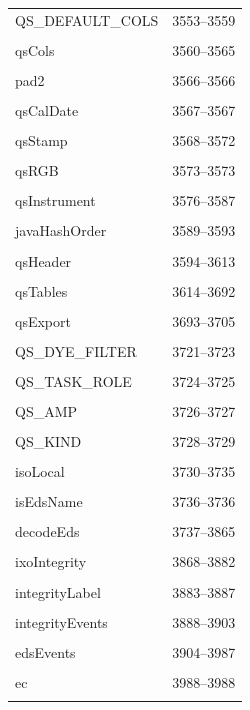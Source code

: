 {\begin{longtable}{@{}p{11cm}r@{}}
QS\_DEFAULT\_COLS & 3553--3559 \\\\\hline
qsCols & 3560--3565 \\\\\hline
pad2 & 3566--3566 \\\\\hline
qsCalDate & 3567--3567 \\\\\hline
qsStamp & 3568--3572 \\\\\hline
qsRGB & 3573--3573 \\\\\hline
qsInstrument & 3576--3587 \\\\\hline
javaHashOrder & 3589--3593 \\\\\hline
qsHeader & 3594--3613 \\\\\hline
qsTables & 3614--3692 \\\\\hline
qsExport & 3693--3705 \\\\\hline
QS\_DYE\_FILTER & 3721--3723 \\\\\hline
QS\_TASK\_ROLE & 3724--3725 \\\\\hline
QS\_AMP & 3726--3727 \\\\\hline
QS\_KIND & 3728--3729 \\\\\hline
isoLocal & 3730--3735 \\\\\hline
isEdsName & 3736--3736 \\\\\hline
decodeEds & 3737--3865 \\\\\hline
ixoIntegrity & 3868--3882 \\\\\hline
integrityLabel & 3883--3887 \\\\\hline
integrityEvents & 3888--3903 \\\\\hline
edsEvents & 3904--3987 \\\\\hline
ec & 3988--3988 \\\\\hline

\end{longtable}}
